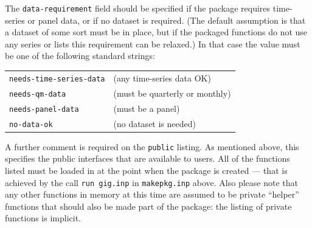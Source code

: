 The \texttt{data-requirement} field should be specified if the package
requires time-series or panel data, or if no dataset is required.
(The default assumption is that a dataset of some sort must be in
place, but if the packaged functions do not use any series or lists
this requirement can be relaxed.)  In that case the value must be one
of the following standard strings:

\begin{center}
\begin{tabular}{ll}
\texttt{needs-time-series-data} & (any time-series data OK) \\ 
\texttt{needs-qm-data} & (must be quarterly or monthly) \\ 
\texttt{needs-panel-data} & (must be a panel) \\
\texttt{no-data-ok} & (no dataset is needed) \\
\end{tabular}
\end{center}

A further comment is required on the \texttt{public} listing. As
mentioned above, this specifies the public interfaces that are
available to users. All of the functions listed must be loaded in
 at the point when the package is created --- that is
achieved by the call \texttt{run gig.inp} in \texttt{makepkg.inp}
above. Also please note that any other functions in memory at this
time are assumed to be private ``helper'' functions that should also
be made part of the package: the listing of private functions is
implicit.



